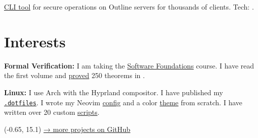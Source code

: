 \documentclass[margin,line]{resume}
\begin{document}
\begin{resume}
\begin{description}
\begin{list2}
        \item{
            \href{https://github.com/alchemmist/outline-vpn-cli}{CLI tool}
            for secure operations on Outline servers for thousands of clients.
            Tech: .}
        \end{list2}

    \end{description}

    \vspace{-4mm}
    \section{\mysidestyle Interests}\vspace{0.7mm}

    {\textbf{Formal Verification:} I am taking the
      \href{https://softwarefoundations.cis.upenn.edu}{Software Foundations}
      course. I have read the first volume and
      \href{https://github.com/alchemmist/coq-learning}{proved} 250
    theorems in .} \\

    \vspace{-6mm}

    \textbf{Linux:} I use Arch with the Hyprland compositor. I have published
    my \href{https://github.com/alchemmist/.dotfiles}{\texttt{.dotfiles}}.
    I wrote my Neovim
    \href{https://github.com/alchemmist/.dotfiles/tree/main/nvim}{config}
    and a color
    \href{https://github.com/alchemmist/nothing.nvim}{theme} from scratch.
    I have written over 20 custom
    \href{https://github.com/alchemmist/.dotfiles/tree/main/scripts}{scripts}.

  \end{resume}

  \begin{minipage}[H]{9.18\textwidth}
    \begin{textblock}{7}(-0.65, 15.1)
      \begingroup
      \hspace{35mm}
      \hypersetup{urlcolor=gray!90}
      \large
      \href{https://github.com/alchemmist}{→ more projects on
      \underline{GitHub}}
      \endgroup
    \end{textblock}

  \end{minipage}

  \clearpage

  
\end{document}
